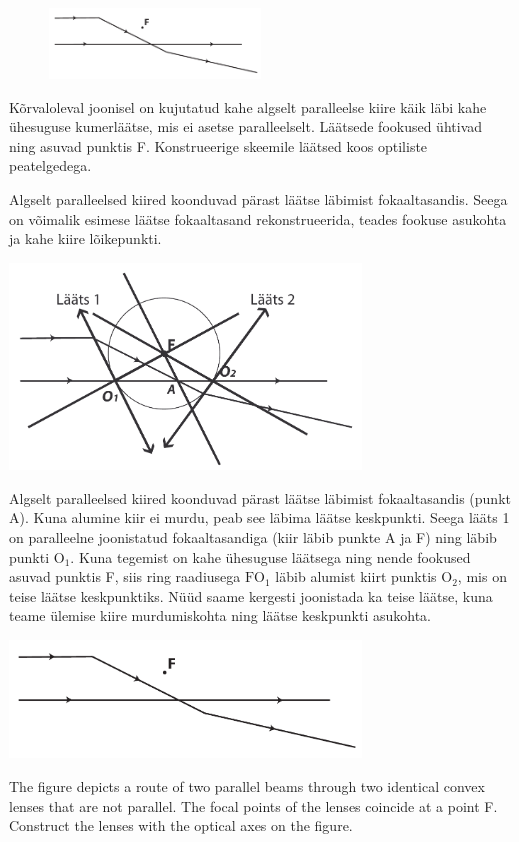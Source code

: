 
\begin{figure}
 \includegraphics[width=0.5\textwidth]{2014-lahg-07-optilineskeemjoonis}
\end{figure}
Kõrvaloleval joonisel on kujutatud kahe algselt paralleelse kiire käik läbi kahe ühesuguse kumerläätse, mis ei asetse paralleelselt. Läätsede fookused ühtivad ning asuvad punktis F. Konstrueerige skeemile läätsed koos optiliste peatelgedega.

\hint
Algselt paralleelsed kiired koonduvad pärast läätse läbimist fokaaltasandis. Seega on võimalik esimese läätse fokaaltasand rekonstrueerida, teades fookuse asukohta ja kahe kiire lõikepunkti.

\solu
\begin{center}
\includegraphics[width=0.7\textwidth]{2014-lahg-07-optilineskeemlahendus}
\end{center}
Algselt paralleelsed kiired koonduvad pärast läätse läbimist fokaaltasandis (punkt A). Kuna alumine kiir ei murdu, peab see läbima läätse keskpunkti. Seega lääts 1 on paralleelne joonistatud fokaaltasandiga (kiir läbib punkte A ja F) ning läbib punkti $\text{O}_1$. Kuna tegemist on kahe ühesuguse läätsega ning nende fookused asuvad punktis F, siis ring raadiusega $\text{FO}_1$ läbib alumist kiirt punktis $\text{O}_2$, mis on teise läätse keskpunktiks. Nüüd saame kergesti joonistada ka teise läätse, kuna teame ülemise kiire murdumiskohta ning läätse keskpunkti asukohta.

\begin{center}
  \includegraphics[width=0.7\textwidth]{2014-lahg-07-optilineskeemjoonis}
\end{center}
The figure depicts a route of two parallel beams through two identical convex lenses that are not parallel. The focal points of the lenses coincide at a point F. Construct the lenses with the optical axes on the figure.

